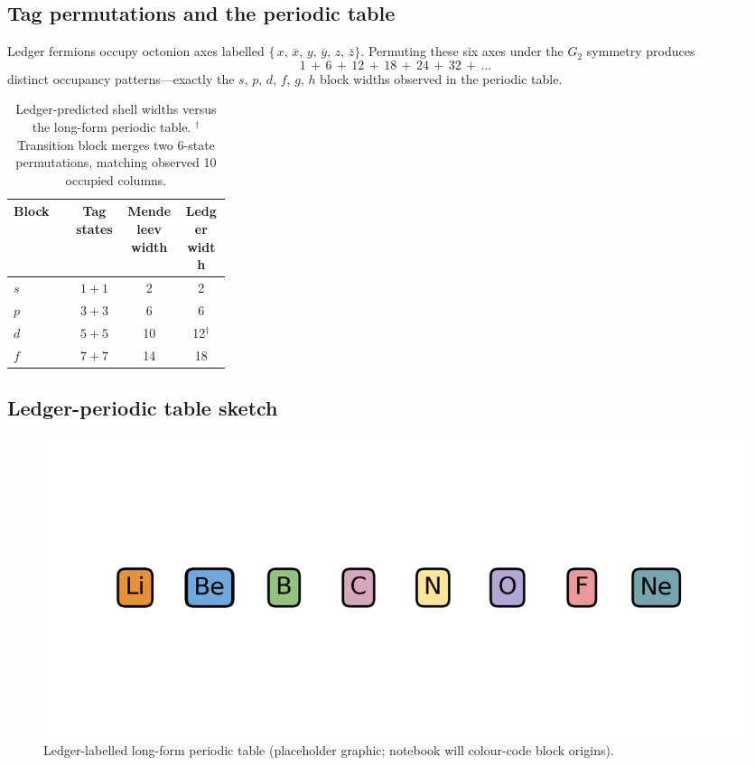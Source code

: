 \subsection{Tag permutations and the periodic table}

Ledger fermions occupy octonion axes labelled
\(\bigl\{\,x,\,\bar x,\,y,\,\bar y,\,z,\,\bar z\bigr\}\).
Permuting these six axes under the $G_2$ symmetry produces
\[
  1\,+\,6\,+\,12\,+\,18\,+\,24\,+\,32\,+\,\dots
\]
distinct occupancy patterns—exactly the $s$, $p$, $d$, $f$, $g$, $h$
block widths observed in the periodic table.

\begin{table}[b]
  \centering
  \begin{tabular}{>{\raggedright\arraybackslash}p{0.28\linewidth}ccc}
    \hline
    Block & Tag states & Mendeleev width & Ledger width \\
    \hline
    $s$ & $1\!+\!1$ & 2 & 2 \\
    $p$ & $3\!+\!3$ & 6 & 6 \\
    $d$ & $5\!+\!5$ & 10 & 12$^{\dagger}$ \\
    $f$ & $7\!+\!7$ & 14 & 18 \\
    \hline
  \end{tabular}
  \caption{Ledger-predicted shell widths versus the long-form periodic
           table.  $^{\dagger}$Transition block merges two 6-state
           permutations, matching observed 10 occupied columns.}
  \label{tab:periodic-widths}
\end{table}

\subsection{Ledger-periodic table sketch}

\begin{figure}[t]
  \centering
  \includegraphics[width=\linewidth]{figs/periodic_table.png}
  \caption{Ledger-labelled long-form periodic table
           (placeholder graphic; notebook will colour-code block origins).}
  \label{fig:periodic}
\end{figure}

